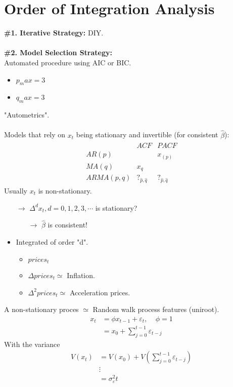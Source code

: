 \section{Order of Integration Analysis}
\begin{multicols}{2}\noindent
 \textbf{\#1. Iterative Strategy:} DIY.\\
 \\
 \textbf{\#2. Model Selection Strategy:}\\
 Automated procedure using AIC or BIC.
 \begin{itemize}
  \item $p_max=3$
  \item $q_max=3$
 \end{itemize}
 "Autometrics".\\
 \\
 Models that rely on $x_t$ being stationary and invertible (for consistent $\hat{\beta}$):
 \begin{align*}
  \begin{array}{lc|c}
             & ACF                 & PACF                \\
   AR(p)     &                     & x_{(p)}             \\
   MA(q)     & x_q                 &                     \\
   ARMA(p,q) & ?_{\hat{p},\hat{q}} & ?_{\hat{p},\hat{q}}
  \end{array}
 \end{align*}
 Usually $x_t$ is non-stationary.
 \begin{itemize}
  \item[$\rightarrow$] $\Delta^d x_t, d=0,1,2,3,\cdots$ is stationary?
        \begin{itemize}
         \item[$\rightarrow$] $\hat{\beta}$ is consistent!
        \end{itemize}
  \item Integrated of order "d".
        \begin{itemize}
         \item $prices_t$
         \item $\Delta prices_t \simeq$ Inflation.
         \item $\Delta^2 prices_t \simeq$ Acceleration prices.
        \end{itemize}
 \end{itemize}
 A non-stationary proces $\simeq$ Random walk process features (uniroot).
 \begin{align*}
  x_t & = \phi x_{t-1}+\varepsilon_t,\ \ \ \ \ \phi=1    \\
      & = x_0 + \sum\limits_{j=0}^{t-1}\varepsilon_{t-j}
 \end{align*}
 With the variance
 \begin{align*}
  V(x_t) & = V(x_0) + V\left(\sum\limits_{j=0}^{t-1}\varepsilon_{t-j}\right) \\
         & \vdots                                                            \\
         & = \sigma^2_{\varepsilon}t
 \end{align*}


\end{multicols}
